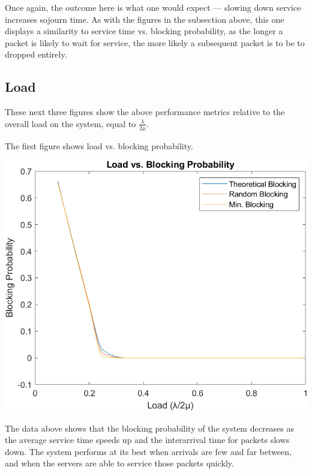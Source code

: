 \documentclass[11pt]{article} %
\begin{document}
Once again, the outcome here is what one would expect — slowing down service increases sojourn time. As with the figures in the subsection above, this one displays a similarity to service time vs. blocking probability, as the longer a packet is likely to wait for service, the more likely a subsequent packet is to be to dropped entirely.

\subsection{Load}

These next three figures show the above performance metrics relative to the overall load on the system, equal to $\frac{\lambda}{2 \mu}$.

The first figure shows load vs. blocking probability.

\begin{center}
\includegraphics[width=.875\textwidth]{7}
\end{center}

The data above shows that the blocking probability of the system decreases as the average service time speeds up and the interarrival time for packets slows down. The system performs at its best when arrivals are few and far between, and when the servers are able to service those packets quickly.
\end{document}
